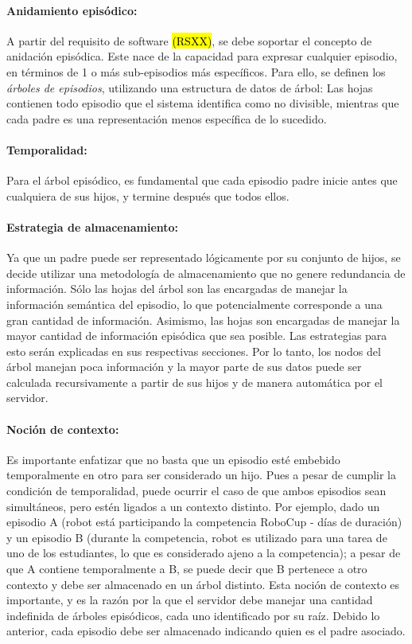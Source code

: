 \paragraph{Anidamiento episódico:}
A partir del requisito de software \hl{(RSXX)}, se debe soportar el concepto de anidación episódica. Este nace de la capacidad para expresar cualquier episodio, en términos de 1 o más sub-episodios más específicos. Para ello, se definen los \textit{árboles de episodios}, utilizando una estructura de datos de árbol: Las hojas contienen todo episodio que el sistema identifica como no divisible, mientras que cada padre es una representación menos específica de lo sucedido.

\paragraph{Temporalidad:}
Para el árbol episódico, es fundamental que cada episodio padre inicie antes que cualquiera de sus hijos, y termine después que todos ellos. 

\paragraph{Estrategia de almacenamiento:}
Ya que un padre puede ser representado lógicamente por su conjunto de hijos, se decide utilizar una metodología de almacenamiento que no genere redundancia de información. Sólo las hojas del árbol son las encargadas de manejar la información semántica del episodio, lo que potencialmente corresponde a una gran cantidad de información. Asimismo, las hojas son encargadas de manejar la mayor cantidad de información episódica que sea posible. Las estrategias para esto serán explicadas en sus respectivas secciones. Por lo tanto, los nodos del árbol manejan poca información y la mayor parte de sus datos puede ser calculada recursivamente a partir de sus hijos y de manera automática por el servidor.

\paragraph{Noción de contexto:}
Es importante enfatizar que no basta que un episodio esté embebido temporalmente en otro para ser considerado un hijo. Pues a pesar de cumplir la condición de temporalidad, puede ocurrir el caso de que ambos episodios sean simultáneos, pero estén ligados a un contexto distinto. Por ejemplo, dado un episodio A (robot está participando la competencia RoboCup - días de duración) y un episodio B (durante la competencia, robot es utilizado para una tarea de uno de los estudiantes, lo que es considerado ajeno a la competencia); a pesar de que A contiene temporalmente a B, se puede decir que B pertenece a otro contexto y debe ser almacenado en un árbol distinto. Esta noción de contexto es importante, y es la razón por la que el servidor debe manejar una cantidad indefinida de árboles episódicos, cada uno identificado por su raíz. Debido lo anterior, cada episodio debe ser almacenado indicando quien es el padre asociado.

